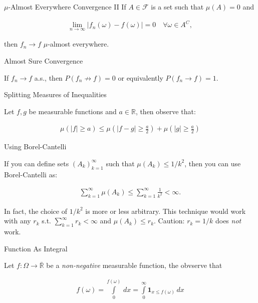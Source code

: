 \documentclass[10pt,landscape]{article}
\renewcommand{\leq}{\leqslant}
\renewcommand{\geq}{\geqslant}
\newcommand{\Indicator}[1]{\mathbf{1}_{#1}}
\newcommand{\CalF}{\mathcal{F}}
\begin{document}
\begin{multicols}{3}
\begin{observation}{}{$\mu$-Almost Everywhere Convergence II}
    If $A \in \CalF$ is a set such that $\mu(A) = 0$ and

        \begin{align*}
            \lim_{n \to \infty} |f_n(\omega) - f(\omega)| = 0 \quad \forall \omega \in A^C,
        \end{align*}

    then $f_n \to f$ $\mu$-almost everywhere.

\end{observation}

\begin{observation}{}{Almost Sure Convergence}

    If $f_n \to f$ a.s., then $P(f_n \not\to f) = 0$ or equivalently $P(f_n \to f) = 1$.

\end{observation}

\begin{observation}{}{Splitting Measures of Inequalities}

    Let $f,g$ be measurable functions and $a \in \mathbb{R}$, then observe that:

        \begin{align*}
            \mu(|f| \geq a) \leq \mu\left( |f - g| \geq \frac{a}{2} \right) + \mu\left( |g| \geq \frac{a}{2} \right)
        \end{align*}

\end{observation}

\begin{observation}{}{Using Borel-Cantelli}

    If you can define sets $(A_k)_{k=1}^{\infty}$ such that $\mu(A_k) \leq 1/k^2$, then you can use Borel-Cantelli as:

        \begin{align*}
            \sum_{k=1}^{\infty} \mu(A_k) \leq \sum_{k=1}^{\infty} \frac{1}{k^2} < \infty.
        \end{align*}

    In fact, the choice of $1/k^2$ is more or less arbitrary. This technique would work with any $r_k$ s.t. $\sum_{k=1}^{\infty} r_k < \infty$ and $\mu(A_k) \leq r_k$. Caution: $r_k = 1/k$ does \emph{not} work.

\end{observation}

\begin{observation}{}{Function As Integral}

    Let $f: \Omega \to \overline{\mathbb{R}}$ be a \emph{non-negative} measurable function, the obvserve that

        \begin{align*}
            f(\omega) = \int\limits_0^{f(\omega)} \, dx = \int\limits_0^{\infty} \Indicator{x \leq f(\omega)} \, dx
        \end{align*}

\end{observation}

\end{multicols}
\end{document}
